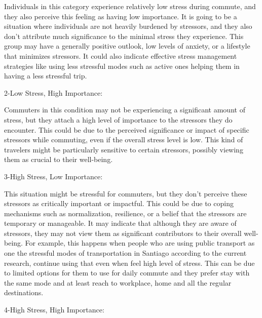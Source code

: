 \documentclass[
11pt, %
oneside, %
english, %
singlespacing, %
]{macthesis} %
\begin{document}
Individuals in this category experience relatively low stress during commute, and they also perceive this feeling as having low importance. It is going to be a situation where individuals are not heavily burdened by stressors, and they also don't attribute much significance to the minimal stress they experience. This group may have a generally positive outlook, low levels of anxiety, or a lifestyle that minimizes stressors. It could also indicate effective stress management strategies like using less stressful modes such as active ones helping them in having a less stressful trip.

2-Low Stress, High Importance:

Commuters in this condition may not be experiencing a significant amount of stress, but they attach a high level of importance to the stressors they do encounter. This could be due to the perceived significance or impact of specific stressors while commuting, even if the overall stress level is low. This kind of travelers might be particularly sensitive to certain stressors, possibly viewing them as crucial to their well-being.

3-High Stress, Low Importance:

This situation might be stressful for commuters, but they don't perceive these stressors as critically important or impactful. This could be due to coping mechanisms such as normalization, resilience, or a belief that the stressors are temporary or manageable. It may indicate that although they are aware of stressors, they may not view them as significant contributors to their overall well-being. For example, this happens when people who are using public transport as one the stressful modes of transportation in Santiago according to the current research, continue using that even when feel high level of stress. This can be due to limited options for them to use for daily commute and they prefer stay with the same mode and at least reach to workplace, home and all the regular destinations.

4-High Stress, High Importance:
\end{document}
